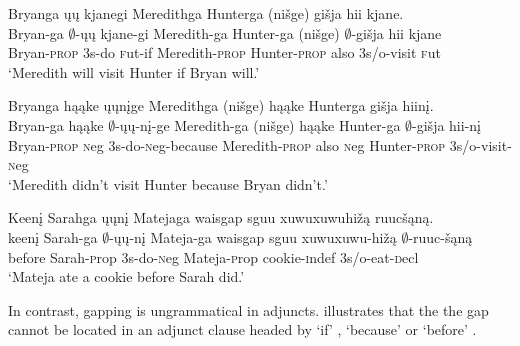 \documentclass[output=paper]{LSP/langsci}
\begin{document}
\ea\label{ex:johnson:35}
\ea\label{ex:johnson:35a} 
\glll Bryanga ųų kjanegi Meredithga Hunterga (nišge) {gišja hii} kjane.\\
Bryan-ga $\emptyset$-ųų kjane-gi Meredith-ga Hunter-ga (nišge) $\emptyset$-{gišja hii} kjane\\
Bryan-\textsc{prop} {\textsc 3s}-do {\textsc fut}-if Meredith-\textsc{prop} Hunter-\textsc{prop} also {\textsc 3s/o}-visit {\textsc fut}\\
\trans `Meredith will visit Hunter if Bryan will.'
 
\ex\label{ex:johnson:35b} 
\glll Bryanga hąąke ųųnįge Meredithga (nišge) hąąke Hunterga {gišja hiinį}.\\
Bryan-ga hąąke $\emptyset$-ųų-nį-ge Meredith-ga (nišge) hąąke Hunter-ga $\emptyset$-{gišja hii-nį}\\
Bryan-\textsc{prop} {\textsc neg} {\textsc 3s}-do-{\textsc neg}-because Meredith-\textsc{prop} also {\textsc neg} Hunter-\textsc{prop} {\textsc 3s/o}-visit-{\textsc neg}\\
\trans `Meredith didn't visit Hunter because Bryan didn't.'
 
\ex\label{ex:johnson:35c} 
\glll Keenį Sarahga ųųnį Matejaga {waisgap sguu xuwuxuwuhižą} ruucšąną.\\
keenį Sarah-ga $\emptyset$-ųų-nį Mateja-ga {waisgap sguu xuwuxuwu-hižą} $\emptyset$-ruuc-šąną\\
before Sarah-{\textsc prop} {\textsc 3s}-do-{\textsc neg} Mateja-{\textsc prop} cookie-{\textsc indef} {\textsc 3s/o}-eat-{\textsc decl}\\
\trans `Mateja ate a cookie before Sarah did.'
\z
\z

In contrast, gapping is ungrammatical in adjuncts.  illustrates that the the gap cannot be located in an adjunct clause headed by `if' , `because'  or `before' .
\end{document}
